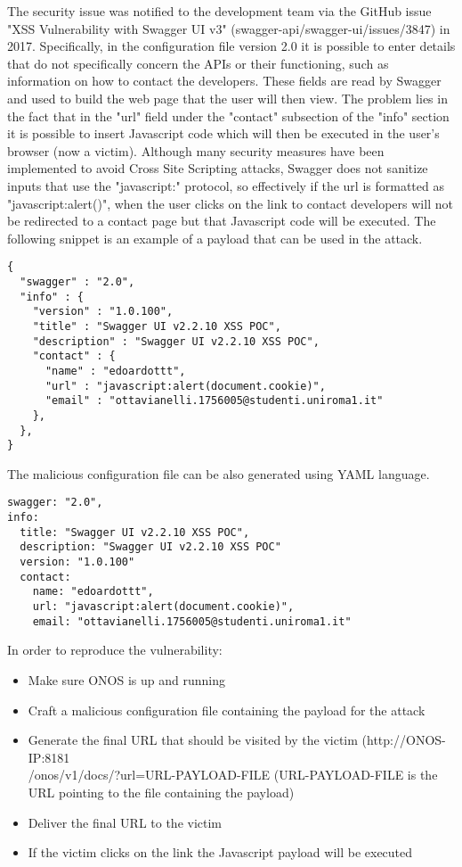The security issue was notified to the development team via the GitHub issue "XSS Vulnerability with Swagger UI v3" (swagger-api/swagger-ui/issues/3847) in 2017. Specifically, in the configuration file version 2.0 it is possible to enter details that do not specifically concern the APIs or their functioning, such as information on how to contact the developers. These fields are read by Swagger and used to build the web page that the user will then view. The problem lies in the fact that in the "url" field under the "contact" subsection of the "info" section it is possible to insert Javascript code which will then be executed in the user's browser (now a victim). Although many security measures have been implemented to avoid Cross Site Scripting attacks, Swagger does not sanitize inputs that use the "javascript:" protocol, so effectively if the url is formatted as "javascript:alert()", when the user clicks on the link to contact developers will not be redirected to a contact page but that Javascript code will be executed. The following snippet is an example of a payload that can be used in the attack.
\begin{lstlisting}
{
  "swagger" : "2.0",
  "info" : {
    "version" : "1.0.100",
    "title" : "Swagger UI v2.2.10 XSS POC",
    "description" : "Swagger UI v2.2.10 XSS POC",
    "contact" : {
      "name" : "edoardottt",
      "url" : "javascript:alert(document.cookie)",
      "email" : "ottavianelli.1756005@studenti.uniroma1.it"
    },
  },
}
\end{lstlisting}

The malicious configuration file can be also generated using YAML language.
\begin{lstlisting}
swagger: "2.0",
info: 
  title: "Swagger UI v2.2.10 XSS POC",
  description: "Swagger UI v2.2.10 XSS POC"
  version: "1.0.100" 
  contact: 
    name: "edoardottt",
    url: "javascript:alert(document.cookie)",
    email: "ottavianelli.1756005@studenti.uniroma1.it"
\end{lstlisting}

In order to reproduce the vulnerability:
\begin{itemize}
    \item Make sure ONOS is up and running
    \item Craft a malicious configuration file containing the payload for the attack
    \item Generate the final URL that should be visited by the victim (http://ONOS-IP:8181\\/onos/v1/docs/?url=URL-PAYLOAD-FILE (URL-PAYLOAD-FILE is the URL pointing to the file containing the payload)
    \item Deliver the final URL to the victim
    \item If the victim clicks on the link the Javascript payload will be executed
\end{itemize}

